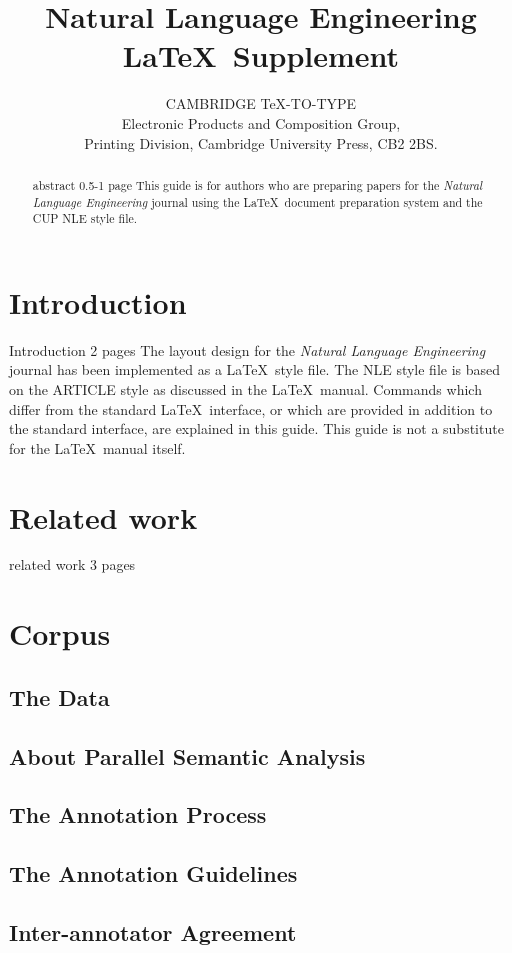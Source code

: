 \documentclass{nle}
\title[Natural Language Engineering]
      {Natural Language Engineering \LaTeX\ Supplement}
\author[\LaTeX\ Supplement]
       {C\ls A\ls M\ls B\ls R\ls I\ls D\ls G\ls E\ns
        \TeX\ls -\ls T\ls O\ls -\ls T\ls Y\ls P\ls E\\
        Electronic Products and Composition Group,\\
        Printing Division, Cambridge University Press,
        CB2 2BS.}
\begin{document}
\label{firstpage}
\maketitle

\begin{abstract}
abstract 0.5-1 page
This guide is for authors who are preparing papers for the {\em Natural
Language Engineering\/} journal using the \LaTeX\ document preparation
system and the CUP NLE style file.
\end{abstract}

\section{Introduction}

Introduction 2 pages
The layout design for the {\em Natural Language Engineering\/} journal
has been implemented as a \LaTeX\ style file. The NLE style file is based
on the ARTICLE style as discussed in the \LaTeX\ manual. Commands which
differ from the standard \LaTeX\ interface, or which are provided in addition
to the standard interface, are explained in this guide. This guide is not a
substitute for the \LaTeX\ manual itself.

\section{Related work}
related work 3 pages

\section{Corpus}
\subsection{The Data}
\subsection{About Parallel Semantic Analysis}
\subsection{The Annotation Process}
\subsection{The Annotation Guidelines}
\subsection{Inter-annotator Agreement}
\end{document}
